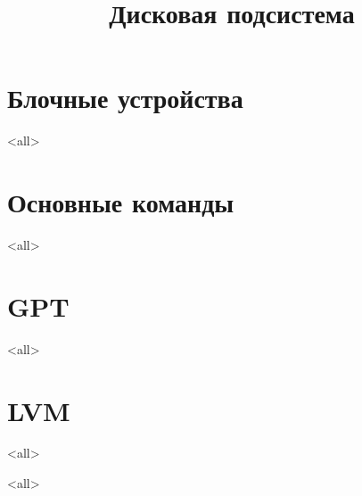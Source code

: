 

\title{Дисковая подсистема}









\section{Блочные устройства}
\mode<all>{}
\section{Основные команды}
\mode<all>{}
\section{GPT}
\mode<all>{}
\section{LVM}
\mode<all>{}

\mode<all>

